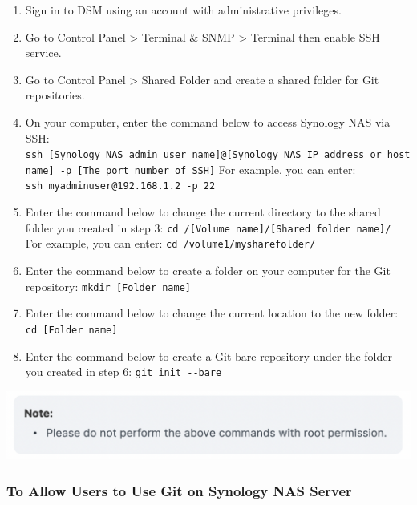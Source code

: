 \documentclass[
]{book}
\providecommand{\tightlist}{%
  \setlength{\itemsep}{0pt}\setlength{\parskip}{0pt}}
\begin{document}
\begin{enumerate}
\def\labelenumi{\arabic{enumi}.}
\tightlist
\item
  Sign in to DSM using an account with administrative privileges.
\item
  Go to Control Panel \textgreater{} Terminal \& SNMP \textgreater{} Terminal then enable SSH service.
\item
  Go to Control Panel \textgreater{} Shared Folder and create a shared folder for Git repositories.
\item
  On your computer, enter the command below to access Synology NAS via SSH:
  \texttt{ssh\ {[}Synology\ NAS\ admin\ user\ name{]}@{[}Synology\ NAS\ IP\ address\ or\ hostname{]}\ -p\ {[}The\ port\ number\ of\ SSH{]}}
  For example, you can enter:
  \texttt{ssh\ myadminuser@192.168.1.2\ -p\ 22}
\item
  Enter the command below to change the current directory to the shared folder you created in step 3:
  \texttt{cd\ /{[}Volume\ name{]}/{[}Shared\ folder\ name{]}/}
  For example, you can enter:
  \texttt{cd\ /volume1/mysharefolder/}
\item
  Enter the command below to create a folder on your computer for the Git repository:
  \texttt{mkdir\ {[}Folder\ name{]}}
\item
  Enter the command below to change the current location to the new folder:
  \texttt{cd\ {[}Folder\ name{]}}
\item
  Enter the command below to create a Git bare repository under the folder you created in step 6:
  \texttt{git\ init\ -\/-bare}
\end{enumerate}

\begin{flushleft}\includegraphics[width=0.85\linewidth]{images/git_root} \end{flushleft}

\hypertarget{to-allow-users-to-use-git-on-synology-nas-server}{%
\subsubsection{To Allow Users to Use Git on Synology NAS Server}\label{to-allow-users-to-use-git-on-synology-nas-server}}
\end{document}
